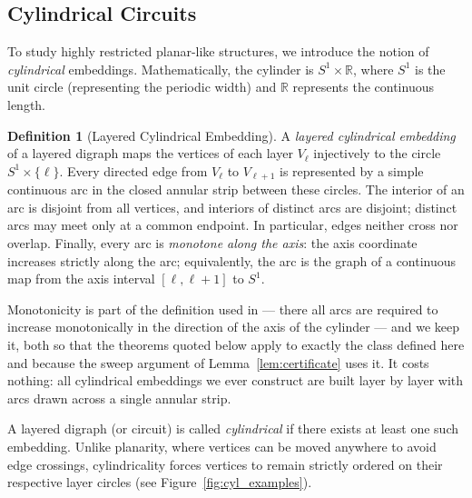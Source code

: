 \documentclass[11pt]{article}
\theoremstyle{definition}
\newtheorem{definition}[theorem]{Definition}
\theoremstyle{remark}
\begin{document}
\subsection{Cylindrical Circuits}\label{sec:cyl}

To study highly restricted planar-like structures, we introduce the notion of \emph{cylindrical} embeddings. Mathematically, the cylinder is $S^1 \times \mathbb{R}$, where $S^1$ is the unit circle (representing the periodic width) and $\mathbb{R}$ represents the continuous length.

\begin{definition}[Layered Cylindrical Embedding]\label{def:cylindrical}
A \emph{layered cylindrical embedding} of a layered digraph maps the vertices
of each layer $V_\ell$ injectively to the circle $S^1\times\{\ell\}$.  Every
directed edge from $V_\ell$ to $V_{\ell+1}$ is represented by a simple
continuous arc in the closed annular strip between these circles.  The
interior of an arc is disjoint from all vertices, and interiors of distinct
arcs are disjoint; distinct arcs may meet only at a common endpoint.  In
particular, edges neither cross nor overlap.  Finally, every arc is \emph{monotone along the axis}: the axis coordinate increases strictly along the arc; equivalently, the arc is the graph of a continuous map from the axis interval $[\ell,\ell+1]$ to $S^1$.
\end{definition}

Monotonicity is part of the definition used in \cite{Hansen03,HMV02} --- there
all arcs are required to increase monotonically in the direction of the axis of
the cylinder --- and we keep it, both so that the theorems quoted below apply to
exactly the class defined here and because the sweep argument of
Lemma~\ref{lem:certificate} uses it.  It costs nothing: all cylindrical
embeddings we ever construct are built layer by layer with arcs drawn across a
single annular strip.

A layered digraph (or circuit) is called \emph{cylindrical} if there exists at least one such embedding. Unlike planarity, where vertices can be moved anywhere to avoid edge crossings, cylindricality forces vertices to remain strictly ordered on their respective layer circles (see Figure~\ref{fig:cyl_examples}).
\end{document}
